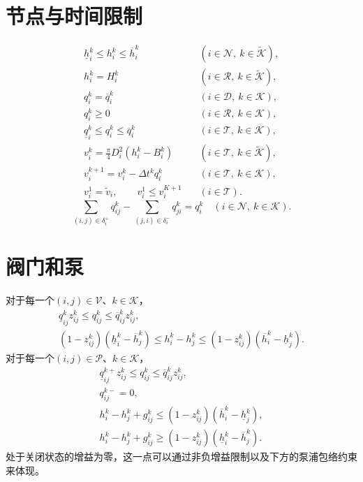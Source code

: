 \documentclass{article}
\begin{document}
\section*{节点与时间限制}
\begin{align}
\underline h_i^k\le h_i^k\le\overline h_i^k
&\quad(i\in\mathcal N,\ k\in\widetilde{\mathcal K}), \tag{1}\\
h_i^k=H_i^k
&\quad(i\in\mathcal R,\ k\in\widetilde{\mathcal K}), \tag{R1}\\
q_i^k=\overline q_i^k
&\quad(i\in\mathcal D,\ k\in\mathcal K), \tag{N1}\\
q_i^k\ge0
&\quad(i\in\mathcal R,\ k\in\mathcal K), \tag{N2}\\
\underline q_i^k\le q_i^k\le\overline q_i^k
&\quad(i\in\mathcal T,\ k\in\mathcal K), \tag{N3}\\
v_i^k=\frac{\pi}{4}D_i^2(h_i^k-B_i^k)
&\quad(i\in\mathcal T,\ k\in\widetilde{\mathcal K}), \tag{2}\\
v_i^{k+1}=v_i^k-\Delta t^kq_i^k
&\quad(i\in\mathcal T,\ k\in\mathcal K), \tag{3}\\
v_i^1=\widetilde v_i,\qquad v_i^1\le v_i^{K+1}
&\quad(i\in\mathcal T). \tag{12}
\end{align}
\begin{equation}
\sum_{(i,j)\in\delta_i^+}q_{ij}^k-
\sum_{(j,i)\in\delta_i^-}q_{ji}^k=q_i^k
\quad(i\in\mathcal N,\ k\in\mathcal K).
\tag{11}
\end{equation}

\section*{阀门和泵}
对于每一个$(i,j)\in\mathcal V$、$k\in\mathcal K$，
\begin{align}
\underline q_{ij}^kz_{ij}^k\le q_{ij}^k\le\overline q_{ij}^kz_{ij}^k, \tag{6}\\
(1-z_{ij}^k)(\underline h_i^k-\overline h_j^k)
\le h_i^k-h_j^k\le
(1-z_{ij}^k)(\overline h_i^k-\underline h_j^k). \tag{7}
\end{align}
对于每一个$(i,j)\in\mathcal P$、$k\in\mathcal K$，
\begin{align}
\underline q_{ij}^{k+}z_{ij}^k\le q_{ij}^k\le\overline q_{ij}^kz_{ij}^k, \tag{8}\\
q_{ij}^{k-}=0, \tag{P1}\\
h_i^k-h_j^k+g_{ij}^k\le(1-z_{ij}^k)(\overline h_i^k-\underline h_j^k), \tag{10a}\\
h_i^k-h_j^k+g_{ij}^k\ge(1-z_{ij}^k)(\underline h_i^k-\overline h_j^k). \tag{10b}
\end{align}
处于关闭状态的增益为零，这一点可以通过非负增益限制以及下方的泵浦包络约束来体现。
\end{document}
